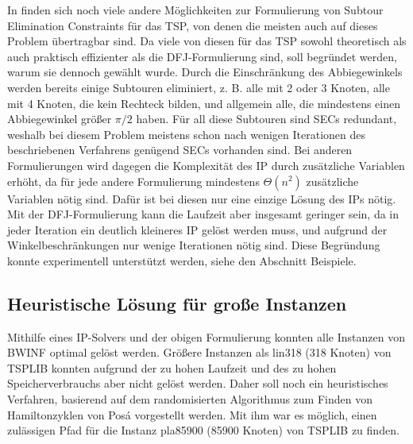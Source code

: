 \documentclass[a4paper, 10pt, ngerman]{article}
\begin{document}
In \cite{tsp-formulations} finden sich noch viele andere Möglichkeiten zur Formulierung von Subtour Elimination Constraints für das TSP, von denen die meisten auch auf dieses Problem übertragbar sind. Da viele von diesen für das TSP sowohl theoretisch als auch praktisch effizienter als die DFJ-Formulierung sind, soll begründet werden, warum sie dennoch gewählt wurde. Durch die Einschränkung des Abbiegewinkels werden bereits einige Subtouren eliminiert, z. B. alle mit 2 oder 3 Knoten, alle mit 4 Knoten, die kein Rechteck bilden, und allgemein alle, die mindestens einen Abbiegewinkel größer $\pi / 2$ haben. Für all diese Subtouren sind SECs redundant, weshalb bei diesem Problem meistens schon nach wenigen Iterationen des beschriebenen Verfahrens genügend SECs vorhanden sind. Bei anderen Formulierungen wird dagegen die Komplexität des IP durch zusätzliche Variablen erhöht, da für jede andere Formulierung mindestens $\Theta(n^2)$ zusätzliche Variablen nötig sind. Dafür ist bei diesen nur eine einzige Lösung des IPs nötig. Mit der DFJ-Formulierung kann die Laufzeit aber insgesamt geringer sein, da in jeder Iteration ein deutlich kleineres IP gelöst werden muss, und aufgrund der Winkelbeschränkungen nur wenige Iterationen nötig sind. Diese Begründung konnte experimentell unterstützt werden, siehe den Abschnitt Beispiele.

\subsection{Heuristische Lösung für große Instanzen}

Mithilfe eines IP-Solvers und der obigen Formulierung konnten alle Instanzen von BWINF optimal gelöst werden. Größere Instanzen als lin318 (318 Knoten) von TSPLIB \cite{tsplib} konnten aufgrund der zu hohen Laufzeit und des zu hohen Speicherverbrauchs aber nicht gelöst werden. Daher soll noch ein heuristisches Verfahren, basierend auf dem randomisierten Algorithmus zum Finden von Hamiltonzyklen von Posá vorgestellt werden. Mit ihm war es möglich, einen zulässigen Pfad für die Instanz pla85900 (85900 Knoten) von TSPLIB zu finden. 
\end{document}
